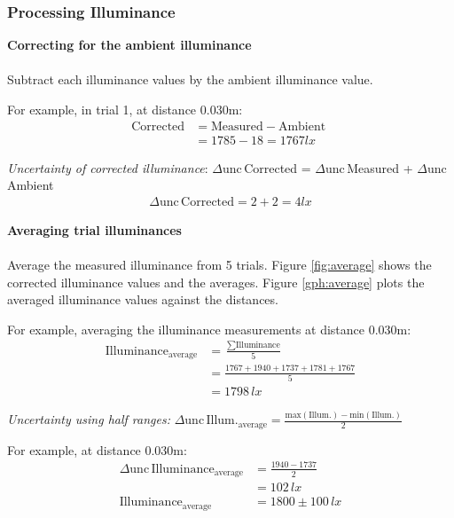 \documentclass[a4paper,12pt]{article}
\newcommand{\absun}{\Delta \text{unc}\,}
\newcommand{\paragraphnl}[1]{\textbf{#1}\\\\}
\begin{document}
\subsubsection{Processing Illuminance}

\paragraphnl{Correcting for the ambient illuminance}
Subtract each illuminance values by the ambient illuminance value.

For example, in trial 1, at distance 0.030m:
\begin{align*}
    \text{Corrected} &= \text{Measured} - \text{Ambient }\\
    &= 1785 - 18 = 1767 \si{lx}
\end{align*}

\textit{Uncertainty of corrected illuminance}: $\absun$Corrected = $\absun$Measured + $\absun$Ambient
\begin{align*}
     \absun \text{Corrected} = 2 + 2 = 4\si{lx}
\end{align*}


\paragraphnl{Averaging trial illuminances}
Average the measured illuminance from 5 trials. Figure \ref{fig:average} shows the corrected illuminance values and the averages. Figure \ref{gph:average} plots the averaged illuminance values against the distances.

For example, averaging the illuminance measurements at distance 0.030m:
\begin{align*}
 \text{Illuminance}_{\text{average}} &= \frac{\sum \text{Illuminance}}{5}\\
 &= \frac{1767+1940+1737+1781+1767}{5}\\
 &= 1798\,\si{lx}
\end{align*}

\textit{Uncertainty using half ranges:} $\absun \text{Illum.}_{\text{average}} = \frac{\text{max}(\text{Illum}.) - \text{min}(\text{Illum}.)}{2}$

For example, at distance 0.030m:
\begin{align*}
 \absun \text{Illuminance}_{\text{average}} &= \frac{1940-1737}{2}\\
 &= 102 \,\si{lx}\\
 \text{Illuminance}_{\text{average}} &= 1800 \pm 100 \,\si{lx}
\end{align*}
\end{document}
